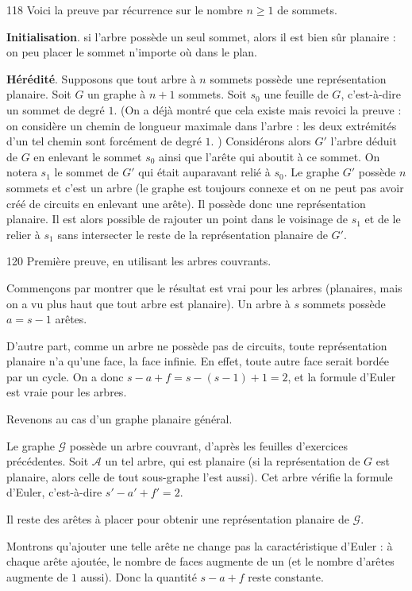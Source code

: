 \begin{Soln}{118}
Voici la preuve par récurrence sur le nombre $n\geq 1$ de sommets.

\textbf{Initialisation}. si l'arbre possède un seul sommet, alors il est bien sûr planaire : on peu placer le sommet n'importe où dans le plan.

\textbf{Hérédité}. Supposons que tout arbre à  $n$ sommets possède une représentation planaire. Soit $G$ un graphe à $n+1$ sommets. Soit $s_0$ une \og feuille\fg{} de $G$, c'est-à-dire un sommet de degré $1$. (On a déjà montré que cela existe mais revoici la preuve : on considère un chemin de longueur maximale dans l'arbre : les deux extrémités d'un tel chemin sont forcément de degré $1$. ) Considérons alors $G'$ l'arbre déduit de $G$ en enlevant le sommet $s_0$ ainsi que l'arête qui aboutit à ce sommet. On notera $s_1$ le sommet de $G'$ qui était auparavant relié à $s_0$. Le graphe $G'$ possède $n$ sommets et c'est un arbre (le graphe est toujours connexe et on ne peut pas avoir créé de circuits en enlevant une arête). Il possède donc une représentation planaire. Il est alors possible de rajouter un point dans le voisinage de $s_1$ et de le relier à $s_1$ sans intersecter le reste de la représentation planaire de $G'$.
\end{Soln}
\begin{Soln}{120}
Première preuve, en utilisant les arbres couvrants.

Commençons par montrer que le résultat est vrai pour les arbres (planaires, mais on a vu plus haut que tout arbre est planaire). Un arbre à $s$ sommets possède $a=s-1$ arêtes.

D'autre part, comme un arbre ne possède pas de circuits, toute représentation planaire n'a qu'une face, la face infinie. En effet, toute autre face serait bordée par un cycle. On a donc $s-a+f = s-(s-1)+1=2$, et la formule d'Euler est vraie pour les arbres.

Revenons au cas d'un graphe planaire général.

Le graphe $\mathcal G$ possède un arbre couvrant, d'après les feuilles d'exercices précédentes. Soit $\mathcal A$ un tel arbre, qui est planaire (si la représentation de $G$ est planaire, alors celle de tout sous-graphe l'est aussi). Cet arbre vérifie la formule d'Euler, c'est-à-dire $s'-a'+f'=2$.

Il reste des arêtes à placer pour obtenir une représentation planaire de $\mathcal G$.

Montrons qu'ajouter une telle arête ne change pas la caractéristique d'Euler : à chaque arête ajoutée, le nombre de faces augmente de un (et le nombre d'arêtes augmente de $1$ aussi). Donc la quantité $s-a+f$ reste constante.
\end{Soln}
